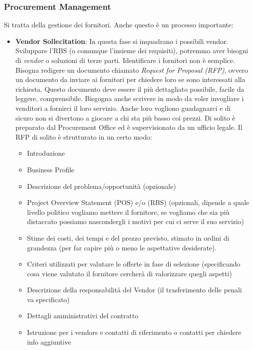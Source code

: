 \subsubsection{Procurement Management}
Si tratta della gestione dei fornitori. Anche questo è un processo importante:
\begin{itemize}
	\item \textbf{Vendor Sollecitation}: In questa fase si inquadrano i possibili vendor. Sviluppare l'RBS (o comunque l'insieme dei requisiti), potremmo aver bisogni di \textit{vendor} o soluzioni di terze parti. Identificare i fornitori non è semplice. Bisogna redigere un documento chiamato \textit{Request for Proposal (RFP)}, ovvero un documento da inviare ai fornitori per chiedere loro se sono interessati alla richiesta. Questo documento deve essere il più dettagliato possibile, facile da leggere, comprensibile. Bisgogna anche scrivere in modo da voler invogliare i venditori a fornirci il loro servizio. Anche loro vogliono guadagnarci e di sicuro non si divertono a giocare a chi sta più basso coi prezzi. Di solito è preparato dal Procurement Office ed è supervisionato da un ufficio legale. Il RFP di solito è strutturato in un certo modo:
	\begin{itemize}
		\item Introduzione
		\item Business Profile
		\item Descrizione del problema/opportunità (opzionale)
		\item Project Overview Statement (POS) e/o (RBS) (opzionali, dipende a quale livello politico vogliamo mettere il fornitore, se vogliamo che sia più distaccato possiamo nascondergli i motivi per cui ci serve il suo servizio)
		\item Stime dei costi, dei tempi e del prezzo previsto, stimato in ordini di grandezza (per far capire più o meno le aspettative desiderate).
		\item Criteri utilizzati per valutare le offerte in fase di selezione (specificando cosa viene valutato il fornitore cercherà di valorizzare quegli aspetti)
		\item Descrizione della responsabilità del Vendor (il trasferimento delle penali va specificato)
		\item Dettagli amministrativi del contratto
		\item Istruzione per i vendors e contatti di riferimento o contatti per chiedere info aggiuntive

\end{itemize}
\end{itemize}

